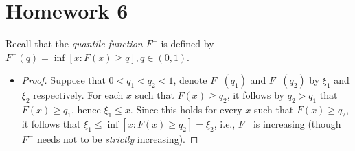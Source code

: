\documentclass{article}
\newcommand{\eps}{\varepsilon}
\theoremstyle{definition}
\theoremstyle{plain}
\theoremstyle{remark}
\begin{document}
\newpage

\section*{Homework 6}

\begin{description}
\begin{comment}
\item[Problem 1]
\begin{proof}
\emph{Necessity:} Suppose $X$ is integrable, hence $E[|X|] < \infty$. Notice that $E[|X|I_{[|X| \geq c]}] \to 0$ as $c \to \infty$ is equivalent to $E[|X|I_{[|X| \geq n]}] \to 0$ as $n \to \infty$ (why?), so I will show that $E[|X|] < \infty$ implies that $E[|X|I_{A_n}] \to 0$ as $n \to \infty$, where $A_n \equiv [|X| \geq n], n = 1, 2, \ldots$. Clearly, $\{|X|I_{A_n}\}$ is dominated by $|X|$, so if we can show that $|X|I_{A_n} \to 0$ almost surely, the result then follows by applying Lebesgue's dominated convergence theorem. 

To show that $|X|I_{A_n} \to_{a.s.} 0$, notice that for each $n$,
$$E[|X|] = E[|X|I_{A_n}] + E[|X|I_{A_n^c}] \geq nP(A_n).$$
Hence we must have $P(A_n) \to 0$ as $n \to \infty$ otherwise it would contradict to the fact $E[|X|] < \infty$. Clearly $\{A_n\}$ is decreasing so that we can define $A \coloneqq \cap_{n = 1}^\infty A_n$. By the continuity
of probability measure, it follows that $P(A) = \lim_n P(A_n) = 0$. For each $\omega \in A^c$, since $A_n \downarrow A$, we have
$$|X(\omega)|I_{A_n}(\omega) \to |X(\omega)|I_A(\omega) = 0,$$
whence $|X|I_{A_n} \to 0$ outside a set of probability $0$, i.e., $|X|I_{A_n} \to_{a.s.} 0$.  

\emph{Sufficiency:} Since $E[|X|I_{[|X| \geq c]}] \to 0$ as $c \to \infty$, given $\eps = 1 > 0$, there exists a sufficiently large $c_0$ such that $E[|X|I_{[|X| \geq c_0]}] < 1$, thereby
$$E[|X|] = E[|X|I_{[|X| < c_0]}] + E[|X|I_{[|X| \geq c_0]}] < c_0 + 1 < \infty.$$
That is, $X$ is integrable.
\end{proof}
\end{comment}

\item[Problem 1]
Recall that the \emph{quantile function} $F^-$ is defined by $F^-(q) = \inf[x: F(x) \geq q], q \in (0, 1)$.

\begin{itemize}
\item 
\begin{proof}
Suppose that $0 < q_1 < q_2 < 1$, denote $F^-(q_1)$ and $F^-(q_2)$ by $\xi_1$ and $\xi_2$ respectively. For 
each $x$ such that $F(x) \geq q_2$, it follows by $q_2 > q_1$ that $F(x) \geq q_1$, hence $\xi_1 \leq x$. Since 
this holds for every $x$ such that $F(x) \geq q_2$, it follows that $\xi_1 \leq \inf[x: F(x) \geq q_2] = \xi_2$, i.e., 
$F^-$ is increasing (though $F^-$ needs not to be \emph{strictly} increasing).


\end{proof}
\end{itemize}
\end{description}
\end{document}
